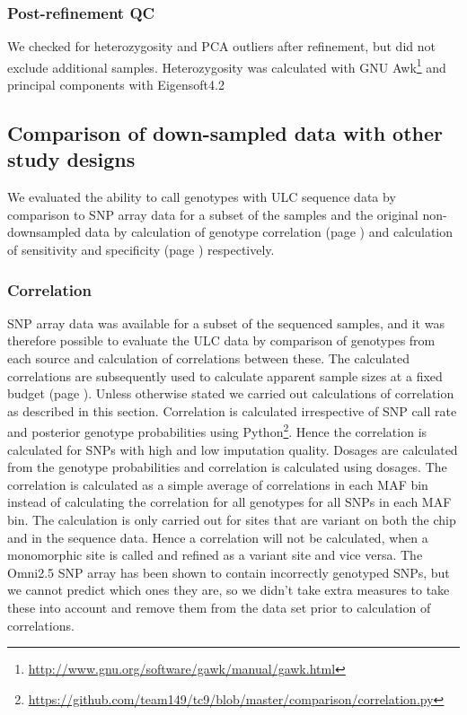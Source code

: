 \subsubsection{Post-refinement \gls{QC}}
We checked for heterozygosity and \gls{PCA} outliers after refinement, but did not exclude additional samples. Heterozygosity was calculated with GNU Awk\footnote{\url{http://www.gnu.org/software/gawk/manual/gawk.html}} and principal components with Eigensoft4.2\cite{10.1371/journal.pgen.0020190}\cite{Price2006}



\subsection{Comparison of down-sampled data with other study designs}
We evaluated the ability to call genotypes with \gls{ULC} sequence data by comparison to SNP array data for a subset of the samples and the original non-downsampled data by calculation of genotype correlation (page \pageref{subsec:correlation}) and calculation of sensitivity and specificity (page \pageref{subsec:sensspec}) respectively.

\subsubsection{Correlation}
\label{subsec:correlation}
SNP array data was available for a subset of the sequenced samples, and it was therefore possible to evaluate the \gls{ULC} data by comparison of genotypes from each source and calculation of correlations between these.
The calculated correlations are subsequently used to calculate apparent sample sizes at a fixed budget (page \pageref{subsec:samplesize}).
Unless otherwise stated we carried out calculations of correlation as described in this section. Correlation is calculated irrespective of SNP call rate and posterior genotype probabilities using Python\footnote{\url{https://github.com/team149/tc9/blob/master/comparison/correlation.py}}. Hence the correlation is calculated for \glspl{SNP} with high and low imputation quality. Dosages are calculated from the genotype probabilities and correlation is calculated using dosages. The correlation is calculated as a simple average of correlations in each \gls{MAF} bin instead of calculating the correlation for all genotypes for all \glspl{SNP} in each \gls{MAF} bin. The calculation is only carried out for sites that are variant on both the chip and in the sequence data. Hence a correlation will not be calculated, when a monomorphic site is called and refined as a variant site and vice versa. The Omni2.5 \gls{SNP} array has been shown to contain incorrectly genotyped SNPs\cite{Gurdasani2015}, but we cannot predict which ones they are, so we didn't take extra measures to take these into account and remove them from the data set prior to calculation of correlations.


